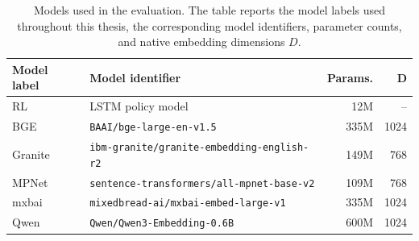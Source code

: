 \begin{table}[t]
\centering
\footnotesize
\setlength{\tabcolsep}{4pt}
\caption{Models used in the evaluation. The table reports the model labels used throughout this thesis, the corresponding model identifiers, parameter counts, and native embedding dimensions $D$.}
\label{tab:model-overview}
\begin{tabular}{@{}p{3.55cm}p{7.45cm}r r@{}}
\toprule
\textbf{Model label} & \textbf{Model identifier} & \textbf{Params.} & $\boldsymbol{D}$ \\
\midrule
RL \citep{bluebaum:2024}
& LSTM policy model
& 12M & -- \\

BGE \citep{xiao:2024,bge:modelcard}
& \texttt{BAAI/bge-large-en-v1.5}
& 335M & 1024 \\

Granite \citep{awasthy:2025graniter2,granite:modelcard}
& \texttt{ibm-granite/granite-embedding-english-r2}
& 149M & 768 \\

MPNet \citep{song:2020mpnet,allmpnet:modelcard}
& \texttt{sentence-transformers/all-mpnet-base-v2}
& 109M & 768 \\

mxbai \citep{mixedbread:2024mxbai,mxbai:modelcard}
& \texttt{mixedbread-ai/mxbai-embed-large-v1}
& 335M & 1024 \\

Qwen \citep{zhang:2025qwen3embedding,qwen3:modelcard}
& \texttt{Qwen/Qwen3-Embedding-0.6B}
& 600M & 1024 \\
\bottomrule
\end{tabular}
\end{table}